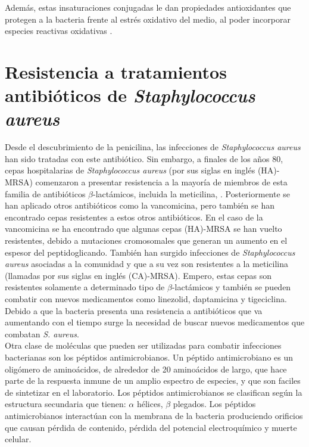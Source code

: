  Adem\'{a}s, estas insaturaciones conjugadas le dan propiedades antioxidantes que protegen a la bacteria frente al estr\'{e}s oxidativo del medio, al poder incorporar especies reactivas oxidativas \cite{Nelson2011}.
\section{Resistencia a tratamientos antibi\'{o}ticos de \textit{Staphylococcus aureus}}\label{ss:anti}
Desde el descubrimiento de la penicilina, las infecciones de \textit{Staphylococcus aureus} han sido tratadas con este antibi\'{o}tico. Sin embargo, a finales de los a\~{n}os 80, cepas hospitalarias de \textit{Staphylococcus aureus} (por sus siglas en ingl\'{e}s (HA)-MRSA) comenzaron a presentar resistencia a la mayor\'{i}a de miembros de esta familia de antibi\'{o}ticos $\beta$-lact\'{a}micos, incluida la meticilina, \cite{Foster2014StaphylococcusAureus}. Posteriormente se han aplicado otros antibi\'{o}ticos como la vancomicina, pero tambi\'{e}n se han encontrado cepas resistentes a estos otros antibi\'{o}ticos. En el caso de la vancomicina se ha encontrado que algunas cepas (HA)-MRSA se han vuelto resistentes, debido a mutaciones cromosomales que generan un aumento en el espesor del peptidoglicando. Tambi\'{e}n han surgido infecciones de \textit{Staphylococcus aureus}  asociadas a la comunidad y que a su vez son resistentes a la meticilina (llamadas por sus siglas en ingl\'{e}s (CA)-MRSA). Empero, estas cepas son resistentes solamente a determinado tipo de $\beta$-lact\'{a}micos y tambi\'{e}n se pueden combatir con nuevos  medicamentos como 
linezolid, daptamicina y tigeciclina.\\
Debido a que la bacteria presenta una resistencia a antibi\'{o}ticos que va aumentando con el tiempo surge la necesidad de buscar nuevos medicamentos que combatan \textit{S. aureus}.\\

Otra clase de mol\'{e}culas que pueden ser utilizadas para combatir infecciones bacterianas son los p\'eptidos antimicrobianos.
Un p\'eptido antimicrobiano es  un olig\'omero de amino\'acidos, de alrededor de 20 amino\'{a}cidos de largo, que hace parte de la respuesta inmune de un amplio espectro de especies, y que son faciles de sintetizar en el laboratorio. Los p\'{e}ptidos antimicrobianos se clasifican seg\'{u}n la estructura secundaria que tienen: $\alpha$ h\'elices, $\beta$ plegados.   Los p\'eptidos antimicrobianos interact\'uan con la membrana de la bacteria produciendo orificios que causan p\'erdida de contenido, p\'{e}rdida del potencial electroqu\'{i}mico y muerte celular.\\

